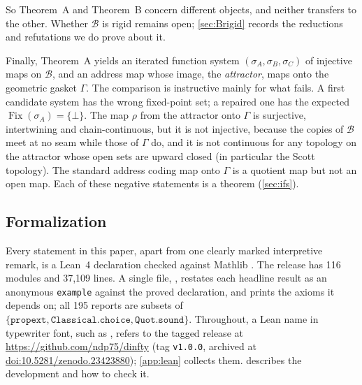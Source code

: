 \documentclass[11pt]{amsart}
\newcommand{\repourl}{https://github.com/ndp75/dinfty}
\newcommand{\repotag}{v1.0.0}
\newcommand{\repodoi}{10.5281/zenodo.23423880}
\theoremstyle{plain}
\theoremstyle{definition}
\newcommand{\Fix}{\operatorname{Fix}}
\newcommand{\BB}{\mathcal{B}}
\newcommand{\GG}{\Gamma}
\begin{document}
So Theorem~A and Theorem~B concern different objects, and neither transfers to
the other. Whether $\BB$ is rigid remains open; \cref{sec:Brigid} records the
reductions and refutations we do prove about it.

Finally, Theorem~A yields an iterated function system $(\sigma_A,\sigma_B,\sigma_C)$
of injective maps on $\BB$, and an address map whose image, the
\emph{attractor}, maps onto the geometric gasket $\GG$. The comparison is
instructive mainly for what fails. A first candidate system has the wrong
fixed-point set; a repaired one has the expected $\Fix(\sigma_A)=\{\bot\}$. The
map $\rho$ from the attractor onto $\GG$ is surjective, intertwining and
chain-continuous, but it is not injective, because the copies of $\BB$ meet at
no seam while those of $\GG$ do, and it is not continuous for any topology on
the attractor whose open sets are upward closed (in particular the Scott
topology). The standard address coding map onto $\GG$ is a quotient map but
not an open map. Each of these negative statements is a theorem
(\cref{sec:ifs}).

\subsection*{Formalization}
Every statement in this paper, apart from one clearly marked interpretive
remark, is a Lean~4 \cite{Lean4} declaration checked against Mathlib
\cite{Mathlib2020}. The release has 116 modules and 37{,}109 lines. A single
file, , restates each headline result as an anonymous
\texttt{example} against the proved declaration, and prints the axioms it
depends on; all 195 reports are subsets of
$\{\texttt{propext},\texttt{Classical.choice},\texttt{Quot.sound}\}$.
Throughout, a Lean name in typewriter font, such as
, refers to the tagged release at
\url{\repourl} (tag \texttt{\repotag}, archived at
\href{https://doi.org/\repodoi}{doi:\repodoi}); \cref{app:lean} collects them.
 describes the development and how to check it.
\end{document}
